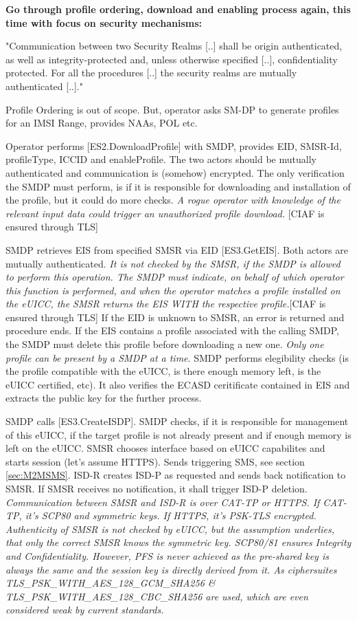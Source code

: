 \textbf{Go through profile ordering, download and enabling process again, this time with focus on security mechanisms:}

"Communication between two Security Realms [..] shall be origin authenticated, as well as integrity-protected and, unless otherwise specified [..], confidentiality protected. For all the procedures [..] the security realms are mutually authenticated [..]."

Profile Ordering is out of scope. But, operator asks SM-DP to generate profiles for an IMSI Range, provides NAAs, POL etc.

Operator performs [ES2.DownloadProfile] with SMDP, provides EID, SMSR-Id, profileType, ICCID and enableProfile. The two actors should be mutually authenticated and communication is (somehow) encrypted. The only verification the SMDP must perform, is if it is responsible for downloading and installation of the profile, but it could do more checks. \textit{A rogue operator with knowledge of the relevant input data could trigger an unauthorized profile download.} [CIAF is ensured through TLS]

SMDP retrieves EIS from specified SMSR via EID [ES3.GetEIS]. Both actors are mutually authenticated. \textit{It is not checked by the SMSR, if the SMDP is allowed to perform this operation. The SMDP must indicate, on behalf of which operator this function is performed, and when the operator matches a profile installed on the eUICC, the SMSR returns the EIS WITH the respective profile.}[CIAF is ensured through TLS]
If the EID is unknown to SMSR, an error is returned and procedure ends. If the EIS contains a profile associated with the calling SMDP, the SMDP must delete this profile before downloading a new one. \textit{Only one profile can be present by a SMDP at a time}. SMDP performs elegibility checks (is the profile compatible with the eUICC, is there enough memory left, is the eUICC certified, etc). It also verifies the ECASD ceritificate contained in EIS and extracts the public key for the further process. 

SMDP calls [ES3.CreateISDP]. SMDP checks, if it is responsible for management of this eUICC, if the target profile is not already present and if enough memory is left on the eUICC. SMSR chooses interface based on eUICC capabilites and starts session (let's assume HTTPS). Sends triggering SMS, see section \ref{sec:M2MSMS}. ISD-R creates ISD-P as requested and sends back notification to SMSR. If SMSR receives no notification, it shall trigger ISD-P deletion. \textit{Communication between SMSR and ISD-R is over CAT-TP or HTTPS. If CAT-TP, it's SCP80 and symmetric keys. If HTTPS, it's PSK-TLS encrypted. Authenticity of SMSR is not checked by eUICC, but the assumption underlies, that only the correct SMSR knows the symmetric key. SCP80/81 ensures Integrity and Confidentiality. However, PFS is never achieved as the pre-shared key is always the same and the session key is directly derived from it. As ciphersuites TLS\_PSK\_WITH\_AES\_128\_GCM\_SHA256 \& TLS\_PSK\_WITH\_AES\_128\_CBC\_SHA256 are used, which are even considered weak by current standards.}

